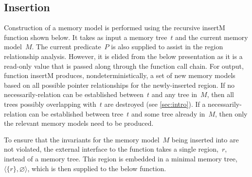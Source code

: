 \subsection{Insertion}
Construction of a memory model is performed
using the recursive \gls{insertM} function shown below.
It takes as input a memory tree~$t$ and the current memory model~$M$.
The current predicate~$P$ is also supplied
to assist in the region relationship analysis.
However, it is elided from the below presentation as it is a read-only value
that is passed along through the function call chain.
For output, function \gls{insertM} produces, nondeterministically,
a set of new memory models based on all possible pointer relationships
for the newly-inserted region.
If no necessarily-relation can be established between~$t$ and any tree in~$M$, then all trees possibly overlapping with~$t$ are destroyed (see \cref{sec:intro}).
If a necessarily-relation can be established between tree~$t$ and some tree already in~$M$, then only the relevant memory models need to be produced.

To ensure that the invariants for the memory model~$M$ being inserted into
are not violated, the external interface to the function takes a single region,~$r$, instead of a memory tree.
This region is embedded in a minimal memory tree,
$\langle \{r\},\varnothing\rangle$,
which is then supplied to the below function.

